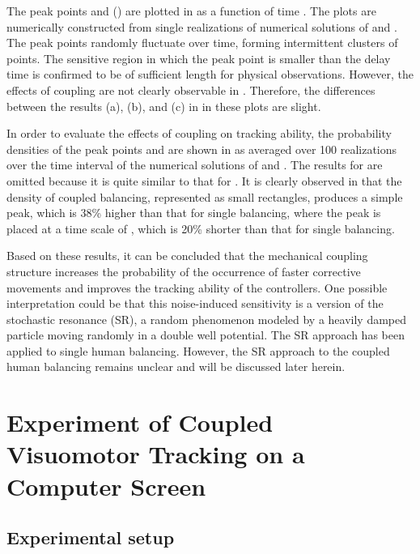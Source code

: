 \documentclass[12pt,a4paper]{ijicic}
\begin{document}
The peak points  and  ()
are plotted in  as a function of time .  The plots are
numerically constructed from single realizations of numerical solutions
of  and .  The peak points randomly
fluctuate over time, forming intermittent clusters of points.
The sensitive region in which the peak point is smaller than the delay
time is confirmed to be of sufficient length for physical observations.
However, the effects of coupling are not clearly observable in
. Therefore, the differences between the results (a), (b),
and (c) in  in these plots are slight.


In order to evaluate the effects of coupling on tracking ability, the
probability densities of the peak points  and
 are shown in  as averaged over
100 realizations over the time interval  of the numerical
solutions of  and . The results for
 are omitted because it is quite similar to that for
. It is clearly observed in  that
the density of coupled balancing, represented as small rectangles,
produces a simple peak, which is 38\% higher than that for single
balancing, where the peak is placed at a time scale of , which
is 20\% shorter than that for single balancing.


Based on these results, it can be concluded that the mechanical coupling
structure increases the probability of the occurrence of faster
corrective movements and improves the tracking ability of the
controllers.
 One possible interpretation could be that this noise-induced
 sensitivity is a version of the stochastic resonance\cite{SR} (SR), a
 random phenomenon modeled by a heavily damped particle moving randomly
 in a double well potential. The SR approach has been applied to single
 human balancing\cite{SR:balance}.  However, the SR approach to the
 coupled human balancing remains unclear and will be discussed later
 herein.


\section{Experiment of Coupled Visuomotor Tracking on a Computer Screen}

\subsection{Experimental setup}
\end{document}
